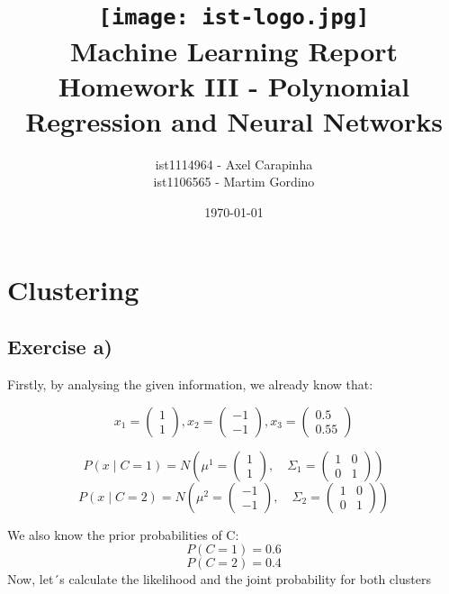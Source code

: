 \documentclass{article}
\title{
\texttt{[image: ist-logo.jpg]}\\[1ex] %
Machine Learning Report \\ 
\large Homework III - Polynomial Regression and Neural Networks
}
\author{ist1114964 - Axel Carapinha \\ ist1106565 - Martim Gordino}
\date{\today}
\begin{document}
\maketitle
\tableofcontents
\newpage

\section{Clustering}
\subsection{Exercise a)}

Firstly, by analysing the given information, we already know that:

\[
x_1 = \begin{pmatrix} 1 \\ 1 \end{pmatrix} , x_2 = \begin{pmatrix} -1 \\ -1 \end{pmatrix} , x_3 = \begin{pmatrix} 0.5 \\ 0.55 \end{pmatrix}
\]

\[
P(x \mid C = 1) = N\left(\mu^1 = \begin{pmatrix} 1 \\ 1 \end{pmatrix}, \quad \Sigma_1 = \begin{pmatrix} 1 & 0 \\ 0 & 1 \end{pmatrix}\right)
\]
\[
P(x \mid C = 2) = N\left(\mu^2 = \begin{pmatrix} -1 \\ -1 \end{pmatrix}, \quad \Sigma_2 = \begin{pmatrix} 1 & 0 \\ 0 & 1 \end{pmatrix}\right)
\]

We also know the prior probabilities of C:
\[
P(C = 1) = 0.6
\]
\[
P(C = 2) = 0.4
\]
\newline
Now, let´s calculate the likelihood and the joint probability for both clusters
\end{document}
